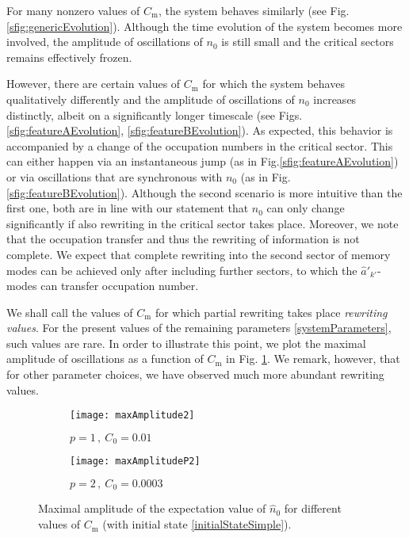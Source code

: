 \documentclass[aps,prd,reprint,superscriptaddress,nofootinbib]{revtex4-2}
\makeatletter
\newcommand*{\fig}{Fig.\@\xspace}
\newcommand*{\figs}{Figs.\@\xspace}
\makeatother
\begin{document}
For many nonzero values of $C_{\text{m}}$, the system behaves similarly (see \fig \ref{sfig:genericEvolution}). Although the time evolution of the 
system becomes more involved, the amplitude of oscillations of $n_0$ is still small and the critical sectors remains effectively frozen. 

However, there are certain values of $C_{\text{m}}$ for which the system behaves qualitatively differently and the amplitude of oscillations of $n_0$ increases distinctly, albeit on a significantly longer timescale (see 
\figs \ref{sfig:featureAEvolution}, \ref{sfig:featureBEvolution}).
As expected, this behavior is accompanied by a change of the occupation numbers in the critical sector. This can either happen via an instantaneous jump (as in \fig \ref{sfig:featureAEvolution}) or via oscillations that 
are synchronous with $n_0$ (as in \fig \ref{sfig:featureBEvolution}). Although the second scenario is more intuitive than the first one, both are in line with our statement that $n_0$ can only change significantly if also rewriting in the critical sector takes place.
Moreover, we note that the occupation transfer and thus the rewriting of information is not complete.
We expect that complete rewriting into the second sector of memory modes can be achieved only after including further sectors, to which the $\hat{a}'_{k'}$-modes can transfer occupation number.


We shall call the values of $C_{\text{m}}$ for which partial rewriting takes place \textit{rewriting values}.
For the present values of the remaining parameters \eqref{systemParameters}, such values are rare. In order to illustrate this point, we plot the maximal amplitude of oscillations as a function of $C_{\text{m}}$ in \fig 
\ref{fig:maxAmplitude}. 
We remark, however, that for other parameter choices, we have observed much more abundant rewriting values.

\begin{figure*}
	\begin{subfigure}{0.4\textwidth}
			\texttt{[image: maxAmplitude2]}
		\caption{$p=1\,,~  C_0 = 0.01$}
		\label{fig:maxAmplitude}
	\end{subfigure}
	\hspace{0.05\textwidth}
		\begin{subfigure}{0.4\textwidth}
	\texttt{[image: maxAmplitudeP2]} 
		\caption{$p=2\,,~  C_0 = 0.0003$}
		\label{fig:maxAmplitudep2}
	\end{subfigure}
	\caption{Maximal amplitude of the expectation value of $\hat{n}_0$ for different values of $C_{\text{m}}$ (with initial state \eqref{initialStateSimple}).}
\end{figure*}
\end{document}
